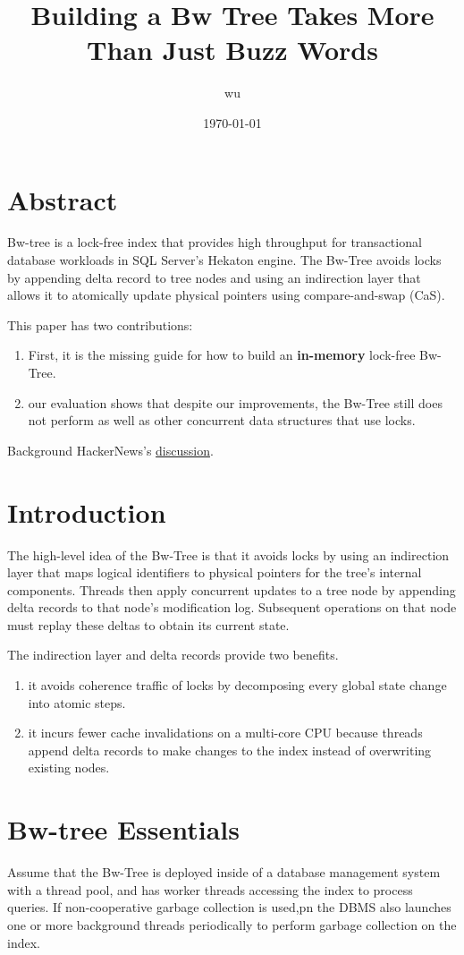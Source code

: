 \documentclass[11pt]{article}
\author{wu}
\date{\today}
\title{Building a Bw Tree Takes More Than Just Buzz Words}
\begin{document}
\maketitle
\section{Abstract}
\label{sec:orgb53b260}
Bw-tree is a lock-free index that provides high throughput for transactional database workloads in SQL
Server’s Hekaton engine. The Bw-Tree avoids locks by appending delta record to tree nodes and using an
indirection layer that allows it to atomically update physical pointers using compare-and-swap (CaS).

This paper has two contributions:
\begin{enumerate}
\item First, it is the missing guide for how to build an \textbf{in-memory} lock-free Bw-Tree.
\item our evaluation shows that despite our improvements, the Bw-Tree still does not perform as well as
other concurrent data structures that use locks.
\end{enumerate}


Background HackerNews's \href{https://news.ycombinator.com/item?id=5521029}{discussion}.
\section{Introduction}
\label{sec:org2619408}
The high-level idea of the Bw-Tree is that it avoids locks by using an indirection layer that maps
logical identifiers to physical pointers for the tree’s internal components. Threads then apply
concurrent updates to a tree node by appending delta records to that node’s modification log.
Subsequent operations on that node must replay these deltas to obtain its current state.


The indirection layer and delta records provide two benefits.
\begin{enumerate}
\item it avoids coherence traffic of locks by decomposing every global state change into atomic steps.
\item it incurs fewer cache invalidations on a multi-core CPU because threads append delta records to
make changes to the index instead of overwriting existing nodes.
\end{enumerate}
\section{Bw-tree Essentials}
\label{sec:org63bb185}
Assume that the Bw-Tree is deployed inside of a database management system with a thread pool, and has
worker threads accessing the index to process queries. If non-cooperative garbage collection is used,pn
the DBMS also launches one or more background threads periodically to perform garbage collection on
the index.
\end{document}
